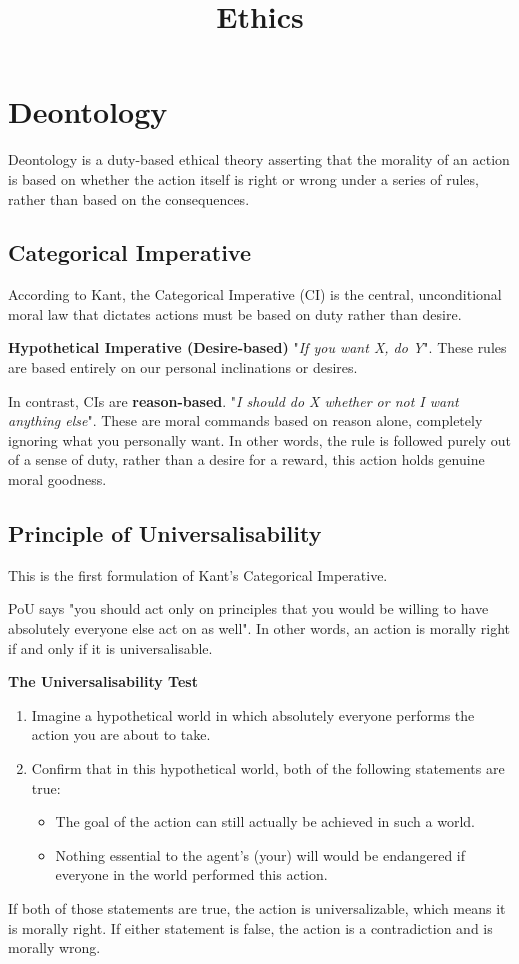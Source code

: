 \documentclass[12pt]{article}
\title{Ethics}
\date{}
\author{}
\begin{document}
\section{Deontology}
Deontology is a duty-based ethical theory asserting that the morality of an action is based on whether the action itself is right or wrong under a series of rules, rather than based on the consequences.

\subsection{Categorical Imperative}
According to Kant, the Categorical Imperative (CI) is the central, unconditional moral law that dictates actions must be based on duty rather than desire.

\noindent\textbf{Hypothetical Imperative (Desire-based)}
"\textit{If you want X, do Y}". These rules are based entirely on our personal inclinations or desires.

\noindent In contrast, CIs are \textbf{reason-based}.
"\textit{I should do X whether or not I want anything else}".
These are moral commands based on reason alone, completely ignoring what you personally want.
In other words, the rule is followed purely out of a sense of duty, rather than a desire for a reward, this action holds genuine moral goodness.

\subsection{Principle of Universalisability}
This is the first formulation of Kant's Categorical Imperative.

\noindent PoU says "you should act only on principles that you would be willing to have absolutely everyone else act on as well".
In other words, an action is morally right if and only if it is universalisable.

\noindent\textbf{The Universalisability Test}
\begin{enumerate}
    \item Imagine a hypothetical world in which absolutely everyone performs the action you are about to take.
    \item Confirm that in this hypothetical world, both of the following statements are true:
    \begin{itemize}
        \item The goal of the action can still actually be achieved in such a world.
        \item Nothing essential to the agent’s (your) will would be endangered if everyone in the world performed this action.
    \end{itemize}
\end{enumerate}
If both of those statements are true, the action is universalizable, which means it is morally right. 
If either statement is false, the action is a contradiction and is morally wrong.
\end{document}
